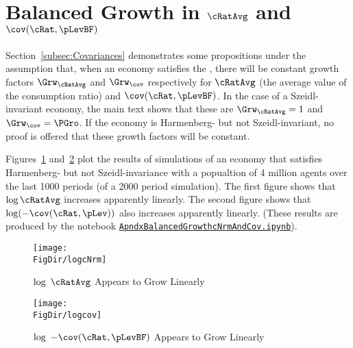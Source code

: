 \documentclass[\econtexRoot/BufferStockTheory]{subfiles}
\begin{document}
\hypertarget{ApndxBalancedGrowthCNrmAndCov}{}
\section{Balanced Growth in $\cRatAvg$ and $\cov(\cRat,\pLevBF)$}\label{sec:ApndxBalancedGrowthCNrmAndCov}


Section~\ref{subsec:Covariances} demonstrates some propositions under the assumption that, when an economy satisfies the {\GIC}, there will be constant growth factors $\Grw_{\cRatAvg}$ and $\Grw_{\cov}$ respectively for $\cRatAvg$ (the average value of the consumption ratio) and $\cov(\cRat,\pLevBF)$.  In the case of a Szeidl-invariant economy, the main text shows that these are $\Grw_{\cRatAvg}=1$ and $\Grw_{\cov}=\PGro$.  If the economy is Harmenberg- but not Szeidl-invariant, no proof is offered that these growth factors will be constant.

Figures~\ref{fig:logcNrm} and~\ref{fig:logcov} plot the results of simulations of an economy that satisfies Harmenberg- but not Szeidl-invariance with a popualtion of 4 million agents over the last 1000 periods (of a 2000 period simulation).  The first figure shows that $\log \cRatAvg$ increases apparently linearly.  The second figure shows that $\log (-\cov(\cRat,\pLev))$ also increases apparently linearly.  (These results are produced by the notebook \href{https://github.com/econ-ark/BufferStockTheory/blob/master/Code/Python/ApndxBalancedGrowthcNrmAndCov.ipynb}{\texttt{ApndxBalancedGrowthcNrmAndCov.ipynb}}).

\pagebreak
\begin{figure}[h]
  \centerline{
    \texttt{[image: \\FigDir/logcNrm]}
  }
  \caption{$\log ~\cRatAvg$ Appears to Grow Linearly}\label{fig:logcNrm}
\end{figure}
\begin{figure}[h]
  \centerline{
    \texttt{[image: \\FigDir/logcov]}
  }
  \caption{$\log ~-\cov(\cRat,\pLevBF)$ Appears to Grow Linearly}\label{fig:logcov}
\end{figure}
\end{document}
